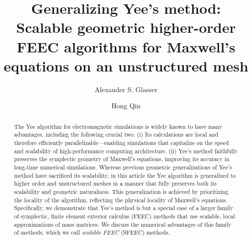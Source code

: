 \documentclass[final,twocolumn]{elsarticle}
\begin{document}
\begin{frontmatter}

\title{Generalizing Yee's method: Scalable geometric higher-order\\FEEC algorithms for Maxwell's equations on an unstructured mesh}


\author[1]{Alexander S. Glasser}
\author[1,2]{Hong Qin}



\begin{abstract}
The Yee algorithm for electromagnetic simulations is widely known to have many advantages, including the following crucial two: (i) Its calculations are local and therefore efficiently parallelizable---enabling simulations that capitalize on the speed and scalability of high-performance computing architecture. \linebreak (ii) Yee's method faithfully preserves the symplectic geometry of Maxwell's equations, improving its accuracy in long-time numerical simulations. Whereas previous geometric generalizations of Yee's method have sacrificed its scalability, in this article the Yee algorithm is generalized to higher order and unstructured meshes in a manner that fully preserves both its scalability and geometric naturalness. This generalization is achieved by prioritizing the locality of the algorithm, reflecting the physical locality of Maxwell's equations. Specifically, we demonstrate that Yee's method is but a special case of a larger family of symplectic, finite element exterior calculus (FEEC) methods that use scalable, local approximations of mass matrices. We discuss the numerical advantages of this family of methods, which we call \emph{scalable FEEC} (SFEEC) methods.
\end{abstract}

\end{frontmatter}
\end{document}
